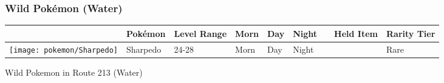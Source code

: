 \subsubsection{Wild Pokémon (Water)}%
\label{ssubsec:WildPokmon(Water)}%
\begin{longtable}{||l l l l l l l l l||}%
\hline%
\rowcolor{WaterColor}%
&Pokémon&Level Range&Morn&Day&Night&&Held Item&Rarity Tier\\%
\hline%
\endhead%
\hline%
\rowcolor{WaterColor}%
\texttt{[image: pokemon/Sharpedo]}&Sharpedo&24{-}28&Morn&Day&Night&&&\textcolor{RedOrange}{%
Rare%
}\\%
\hline%
\end{longtable}%
\caption{Wild Pokemon in Route 213 (Water)}